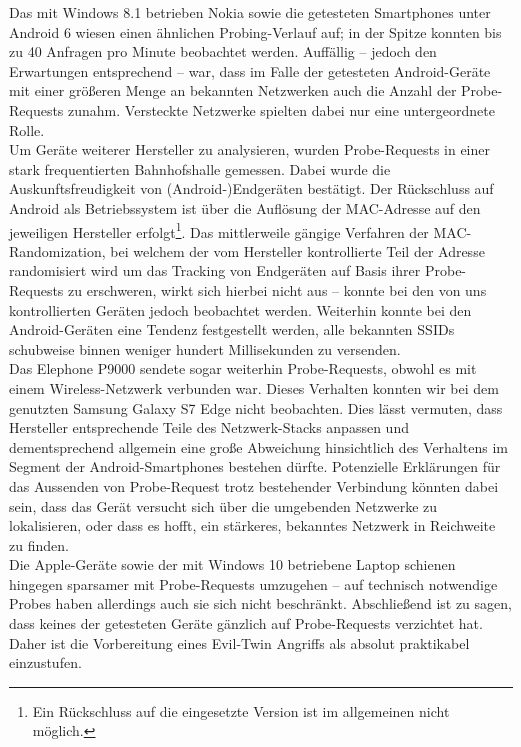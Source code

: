 Das mit Windows 8.1 betrieben Nokia sowie die getesteten Smartphones unter Android 6 wiesen einen ähnlichen Probing-Verlauf auf; in der Spitze konnten bis zu 40 Anfragen pro Minute beobachtet werden.
Auffällig -- jedoch den Erwartungen entsprechend -- war, dass im Falle der getesteten Android-Geräte mit einer größeren Menge an bekannten Netzwerken auch die Anzahl der Probe-Requests zunahm. Versteckte Netzwerke spielten dabei nur eine untergeordnete Rolle.\\

Um Geräte weiterer Hersteller zu analysieren, wurden Probe-Requests in einer stark frequentierten Bahnhofshalle gemessen. Dabei wurde die Auskunftsfreudigkeit von (Android-)Endgeräten bestätigt. Der Rückschluss auf Android als Betriebssystem ist über die Auflösung der MAC-Adresse auf den jeweiligen Hersteller erfolgt\footnote{Ein Rückschluss auf die eingesetzte Version ist im allgemeinen nicht möglich.}.
Das mittlerweile gängige Verfahren der MAC-Randomization, bei welchem der vom Hersteller kontrollierte Teil der Adresse randomisiert wird um das Tracking von Endgeräten auf Basis ihrer Probe-Requests zu erschweren, wirkt sich hierbei nicht aus -- konnte bei den von uns kontrollierten Geräten jedoch beobachtet werden.
Weiterhin konnte bei den Android-Geräten eine Tendenz festgestellt werden, alle bekannten SSIDs schubweise binnen weniger hundert Millisekunden zu versenden.\\

Das Elephone P9000 sendete sogar weiterhin Probe-Requests, obwohl es mit einem Wireless-Netzwerk verbunden war. Dieses Verhalten konnten wir bei dem genutzten Samsung Galaxy S7 Edge nicht beobachten. Dies lässt vermuten, dass Hersteller entsprechende Teile des Netzwerk-Stacks anpassen und dementsprechend allgemein eine große Abweichung hinsichtlich des Verhaltens im Segment der Android-Smartphones bestehen dürfte.
Potenzielle Erklärungen für das Aussenden von Probe-Request trotz bestehender Verbindung könnten dabei sein, dass das Gerät versucht sich über die umgebenden Netzwerke zu lokalisieren, oder dass es hofft, ein stärkeres, bekanntes Netzwerk in Reichweite zu finden.\\

Die Apple-Geräte sowie der mit Windows 10 betriebene Laptop schienen hingegen sparsamer mit Probe-Requests umzugehen -- auf technisch notwendige Probes haben allerdings auch sie sich nicht beschränkt.
Abschließend ist zu sagen, dass keines der getesteten Geräte gänzlich auf Probe-Requests verzichtet hat.
Daher ist die Vorbereitung eines Evil-Twin Angriffs als absolut praktikabel einzustufen.

